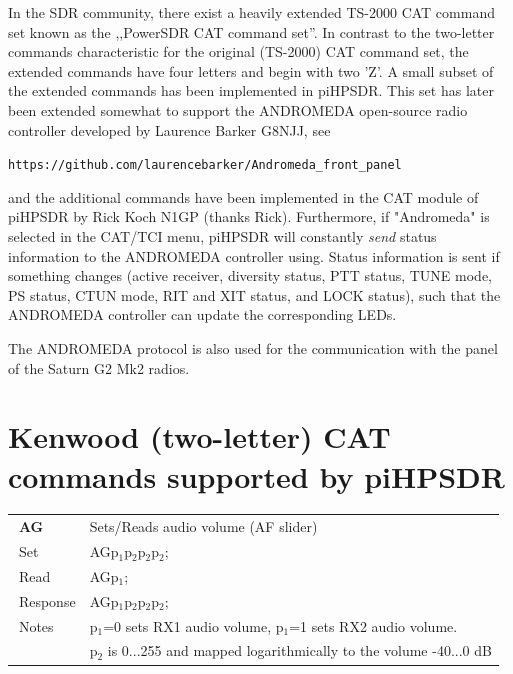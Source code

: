 \documentclass[12pt]{book}
\def\pH{pi\-HPSDR\xspace}
\begin{document}
In the SDR community, there exist a heavily extended TS-2000 CAT command set known as the ,,PowerSDR CAT
command set''. In contrast to the two-letter commands characteristic for the original (TS-2000) CAT
command set, the extended commands have four letters and begin with two 'Z'.
A small subset of the extended commands  has been implemented in \pH. This set has later been extended
somewhat to support the  ANDROMEDA open-source radio controller developed by Laurence Barker G8NJJ, see

\texttt{https://github.com/laurencebarker/Andromeda\_front\_panel}

and the additional commands have been implemented in
the CAT module of \pH by Rick Koch N1GP (thanks Rick).
Furthermore, if "Andromeda" is selected in the CAT/TCI menu,
\pH will constantly
\textit{send} status information to the ANDROMEDA controller using. Status information is
sent if something
changes (active receiver,  diversity status, PTT status, TUNE mode, PS status, CTUN mode, RIT and XIT
status, and LOCK status),
such that the ANDROMEDA controller can update the corresponding LEDs.

The ANDROMEDA protocol is also used for the communication with the panel of the Saturn G2 Mk2 radios.


%
%



\section[Kenwood CAT commands]{Kenwood (two-letter) CAT commands supported by \pH}

\begin{center}
\begin{tabular}{|p{2cm}|p{11cm}|}
\toprule
$\phantom{\Big|}$\textbf{\large AG} & Sets/Reads audio volume (AF slider) \\\cline{1-2}
$\phantom{\Big|}${\large Set} & {AGp$_1$p$_2$p$_2$p$_2$;} \\\hline
$\phantom{\Big|}${\large Read} & {AGp$_1$;} \\\hline
$\phantom{\Big|}${\large Response} & {AGp$_1$p$_2$p$_2$p$_2$;} \\\hline
$\phantom{\Big|}${\large Notes} & \multicolumn{1}{|p{11cm}|}{p$_1$=0 sets RX1 audio volume, p$_1$=1 sets RX2 audio volume.} \\
& \multicolumn{1}{|p{11cm}|}{p$_2$ is 0...255 and mapped logarithmically to the volume -40...0 dB} \\
\bottomrule
\end{tabular}
\end{center}
\end{document}
